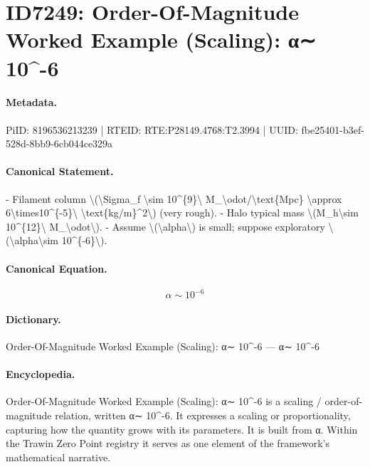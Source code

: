 \section*{ID7249: Order-Of-Magnitude Worked Example (Scaling): α∼ 10\textasciicircum{}-6}
\paragraph{Metadata.}
PiID: 8196536213239 | RTEID: RTE:P28149.4768:T2.3994 | UUID: fbe25401-b3ef-528d-8bb9-6cb044ce329a

\paragraph{Canonical Statement.}
- Filament column \textbackslash{}(\textbackslash{}Sigma\_f \textbackslash{}sim 10\textasciicircum{}\{9\}\textbackslash{} M\_\textbackslash{}odot/\textbackslash{}text\{Mpc\} \textbackslash{}approx 6\textbackslash{}times10\textasciicircum{}\{-5\}\textbackslash{} \textbackslash{}text\{kg/m\}\textasciicircum{}2\textbackslash{}) (very rough). - Halo typical mass \textbackslash{}(M\_h\textbackslash{}sim 10\textasciicircum{}\{12\}\textbackslash{} M\_\textbackslash{}odot\textbackslash{}). - Assume \textbackslash{}(\textbackslash{}alpha\textbackslash{}) is small; suppose exploratory \textbackslash{}(\textbackslash{}alpha\textbackslash{}sim 10\textasciicircum{}\{-6\}\textbackslash{}).

\paragraph{Canonical Equation.}
\[
\alpha\sim 10^{-6}
\]

\paragraph{Dictionary.}
Order-Of-Magnitude Worked Example (Scaling): α∼ 10\textasciicircum{}-6 — α∼ 10\textasciicircum{}-6

\paragraph{Encyclopedia.}
Order-Of-Magnitude Worked Example (Scaling): α∼ 10\textasciicircum{}-6 is a scaling / order-of-magnitude relation, written α∼ 10\textasciicircum{}-6. It expresses a scaling or proportionality, capturing how the quantity grows with its parameters. It is built from α. Within the Trawin Zero Point registry it serves as one element of the framework's mathematical narrative.
